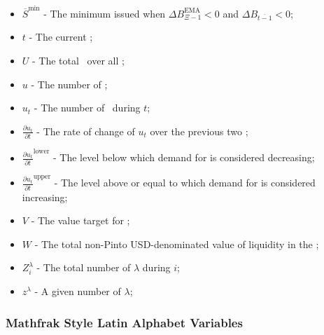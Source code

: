\documentclass[class=article, crop=false]{standalone}
\begin{document}
\begin{itemize}[topsep=0pt, itemsep=3pt,leftmargin=16pt]
    \item[] $\overline{S}^{\text{min}}$ - The minimum  issued when $\Delta B_{\Xi-1}^{\text{EMA}} < 0$ and $\Delta B_{\overline{t-1}} < 0$;
    \item[] $t$ - The current ;
    \item[] $U$ - The total  \Pinto\ over all ;
    \item[] $u$ - The number of  \Pinto;
    \item[] $u_{t}$ - The number of  \Pinto\ during $t$;
    \item[] $\frac{\partial u_{t}}{\partial t}$ - The rate of change of $u_{t}$ over the previous two ;
    \item[] $\frac{\partial u_{t}}{\partial t}^{\text{lower}}$ - The level below which demand for  is considered decreasing;
    \item[] $\frac{\partial u_{t}}{\partial t}^{\text{upper}}$ - The level above or equal to which demand for  is considered increasing;
    \item[] $V$ - The value target for ;
    \item[] $W$ - The total non-Pinto USD-denominated value of liquidity in the ;
    \item[] $Z_{i}^{\lambda}$ - The total number of $\lambda$  during  $i$;
    \item[] $z^{\lambda}$ - A given number of  $\lambda$;
\end{itemize}


\subsubsection{Mathfrak Style Latin Alphabet Variables}
\end{document}
